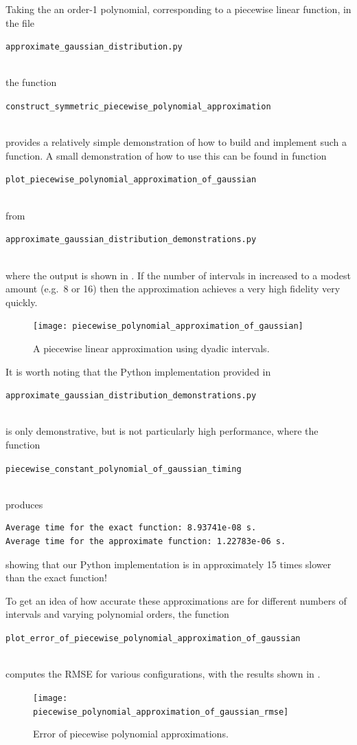 \documentclass[11pt,a4paper,twoside,english]{extarticle}
\newcommand{\singlecodeline}[1]{\\[1em]\centerline{\lstinline[basicstyle=\ttfamily]$#1$}\\[1em]}
\begin{document}
Taking the an order-1 polynomial, corresponding to a piecewise linear function, in the file \singlecodeline{approximate_gaussian_distribution.py} the function \singlecodeline{construct_symmetric_piecewise_polynomial_approximation} provides a relatively simple demonstration of how to build and implement such a function. A small demonstration of how to use this can be found in function \singlecodeline{plot_piecewise_polynomial_approximation_of_gaussian} from \singlecodeline{approximate_gaussian_distribution_demonstrations.py}
where the output is shown in . If the number of intervals in increased to a modest amount (e.g.~8 or 16) then the approximation achieves a very high fidelity very quickly. 

\begin{figure}[htb]
\centering
\texttt{[image: piecewise\_polynomial\_approximation\_of\_gaussian]}
\caption{A piecewise linear approximation using dyadic intervals.}
\label{fig:piecewise_polynomial_approximation_of_gaussian}
\end{figure}

It is worth noting that the Python implementation provided in 
\singlecodeline{approximate_gaussian_distribution_demonstrations.py}
is only demonstrative, but is not particularly high performance, where the function \singlecodeline{piecewise_constant_polynomial_of_gaussian_timing}
produces
\begin{verbatim}
Average time for the exact function: 8.93741e-08 s.
Average time for the approximate function: 1.22783e-06 s.
\end{verbatim}
showing that our Python implementation is in approximately 15 times slower than the exact function! 

To get an idea of how accurate these approximations are for different numbers of intervals and varying polynomial orders, the function \singlecodeline{plot_error_of_piecewise_polynomial_approximation_of_gaussian} computes the RMSE for various configurations, with the results shown in .

\begin{figure}[htb]
\centering
\texttt{[image: piecewise\_polynomial\_approximation\_of\_gaussian\_rmse]}
\caption{Error of piecewise polynomial approximations.}
\label{fig:piecewise_polynomial_approximation_of_gaussian_rmse}
\end{figure}
\end{document}
